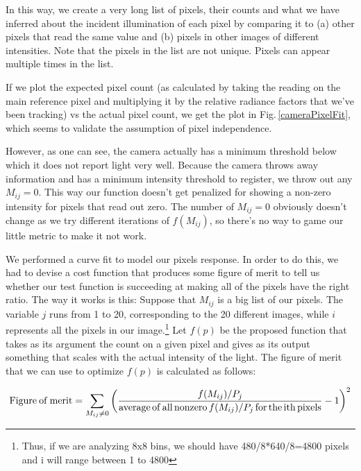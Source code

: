 In this way, we create a very long list of pixels, their counts and what we have inferred about the incident illumination of each pixel by comparing it to (a) other pixels that read the same value and (b) pixels in other images of different intensities. Note that the pixels in the list are not unique. Pixels can appear multiple times in the list.

If we plot the expected pixel count (as calculated by taking the reading on the main reference pixel and multiplying it by the relative radiance factors that we've been tracking) vs the actual pixel count, we get the plot in Fig.\,\ref{cameraPixelFit}, which seems to validate the assumption of pixel independence.

However, as one can see, the camera actually has a minimum threshold below which it does not report light very well. Because the camera throws away information and has a minimum intensity threshold to register, we throw out any $M_{i j}=0$. This way our function doesn't get penalized for showing a non-zero intensity for pixels that read out zero. The number of $M_{i j}=0$ obviously doesn't change as we try different iterations of $f(M_{ij})$, so there's no way to game our little metric to make it not work.

We performed a curve fit to model our pixels response. In order to do this, we had to devise a cost function that produces some figure of merit to tell us whether our test function is succeeding at making all of the pixels have the right ratio. The way it works is this: Suppose that $M_{i j}$ is a big list of our pixels. The variable $j$ runs from 1 to 20, corresponding to the 20 different images, while $i$ represents all the pixels in our image.\footnote{Thus, if we are analyzing 8x8 bins, we should have 480/8*640/8=4800 pixels and i will range between 1 to 4800} Let $f(p)$ be the proposed function that takes as its argument the count on a given pixel and gives as its output something that scales with the actual intensity of the light. The figure of merit that we can use to optimize $f(p)$ is calculated as follows: 

\begin{equation}\label{fom}
{\rm Figure\:of\:merit}=\sum_{ M_{i j}\neq 0}\left(\frac{f(M_{i j})/P_j}{{\rm average\,of\,all\,nonzero\,} f(M_{i j})/P_j {\rm \,for\,the\,ith\,pixels}}-1\right)^2
\end{equation}


